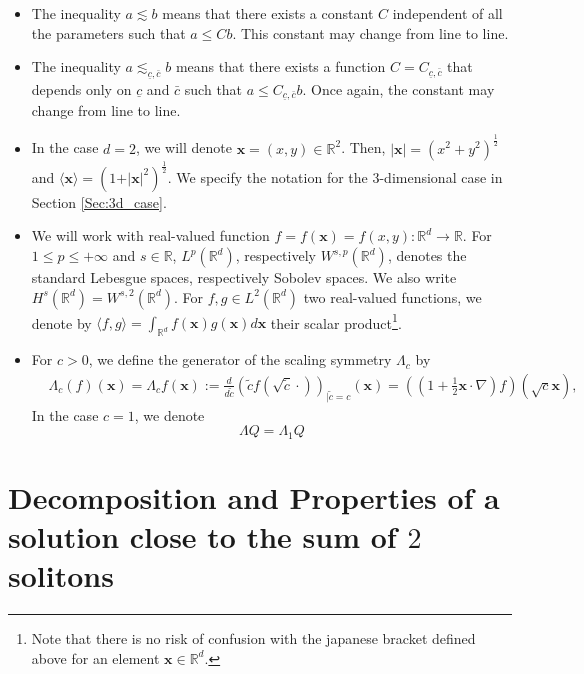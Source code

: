 \documentclass[reqno,10pt]{amsart}
\numberwithin{equation}{section}
\newcommand{\bx}{\mathbf{x}}
\begin{document}
	\begin{itemize}
		\item The inequality $a \lesssim b$ means that there exists a constant $C$ independent of all the parameters such that $a \leq C b$. This constant may change from line to line.
		
		\item The inequality $a \lesssim_{\underline{c},\bar{c}} b$ means that there exists a function $C=C_{\underline{c}, \bar{c}}$ that depends only on $\underline{c}$ and $\bar{c}$ such that $a \leq C_{\underline{c}, \bar{c}} b$. Once again, the constant may change from line to line. 
		
		\item In the case $d=2$, we will denote $\bx =(x,y) \in \mathbb R^2$. Then, $\vert \bx \vert=(x^2+y^2)^{\frac12}$ and $\langle \bx \rangle=(1+\vert \bx \vert^2)^{\frac12}.$ We specify the notation for the $3$-dimensional case in Section \ref{Sec:3d_case}.
		
		\item We will work with real-valued function $f=f(\bx)=f(x,y): \mathbb R^d \to \mathbb R$. For $1 \le p \le +\infty$ and $s \in \mathbb R$, $L^p(\mathbb R^d)$, respectively $W^{s,p}(\mathbb R^d)$, denotes the standard Lebesgue spaces, respectively Sobolev spaces. We also write $H^s(\mathbb R^d)=W^{s,2}(\mathbb R^d)$. 
		For $f,g \in L^2(\mathbb R^d)$ two real-valued functions, we denote 
		by $\langle f,g \rangle =\int_{\mathbb R^d} f(\bx)g(\bx) d\bx$ their scalar product\footnote{Note that there is no risk of confusion with the japanese bracket defined above for an element $\bx \in \mathbb R^d$.}. 
		
		
		
		\item For $c>0$, we define the generator of the scaling symmetry $\Lambda_c$ by
		\begin{align}
			& \Lambda_c (f)(\bx) = \Lambda_c f(\bx) := \frac{d}{d\tilde{c}} \left( \tilde{c} f(\sqrt{\tilde{c}} \cdot) \right)_{\vert \tilde{c}=c}(\bx) = \left( \left(1+\frac{1}{2}\bx \cdot \nabla\right)  f\right)\left( \sqrt{c} \bx \right), \label{defi:Lambda}
		\end{align}
		In the case $c=1$, we denote 
		\begin{equation} \label{defi:Lambda_Q}
			\Lambda Q=\Lambda_1 Q
		\end{equation}
	\end{itemize}
	
	
	
	\section{Decomposition and Properties of a solution close to the sum of \texorpdfstring{$2$}{2} solitons} \label{Sec:property}
\end{document}
